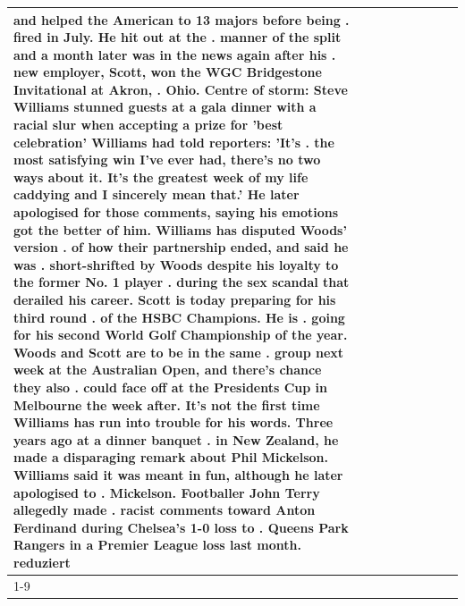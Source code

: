 \begin{table}[H]
\begin{tabular}{lllrlllll}
and helped the American to 13 majors before being . fired in July. He hit out at the . manner of the split and a month later was in the news again after his . new employer, Scott, won the WGC Bridgestone Invitational at Akron, . Ohio. Centre of storm: Steve Williams stunned guests at a gala dinner with a racial slur when accepting a prize for 'best celebration' Williams had told reporters: 'It's . the most satisfying win I've ever had, there's no two ways about it. It's the greatest week of my life caddying and I sincerely mean that.' He later apologised for those comments, saying his emotions got the better of him. Williams has disputed Woods' version . of how their partnership ended, and said he was . short-shrifted by Woods despite his loyalty to the former No. 1 player . during the sex scandal that derailed his career. Scott is today preparing for his third round . of the HSBC Champions. He is . going for his second World Golf Championship of the year. Woods and Scott are to be in the same . group next week at the Australian Open, and there's chance they also . could face off at the Presidents Cup in Melbourne the week after. It's not the first time Williams has run into trouble for his words. Three years ago at a dinner banquet . in New Zealand, he made a disparaging remark about Phil Mickelson. Williams said it was meant in fun, although he later apologised to . Mickelson. Footballer John Terry allegedly made . racist comments toward Anton Ferdinand during Chelsea's 1-0 loss to . Queens Park Rangers in a Premier League loss last month. reduziert \\
\cline{1-9}

\end{tabular}
\end{table}
